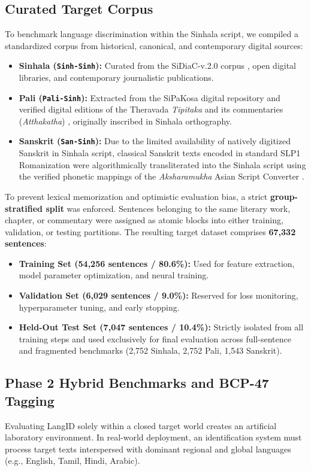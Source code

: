 \documentclass[11pt]{article}
\begin{document}
\subsection{Curated Target Corpus}
To benchmark language discrimination within the Sinhala script, we compiled a standardized corpus from historical, canonical, and contemporary digital sources:
\begin{itemize}
    \item \textbf{Sinhala (\texttt{Sinh-Sinh}):} Curated from the SiDiaC-v.2.0 corpus \cite{welgama2021sidiac}, open digital libraries, and contemporary journalistic publications.
    \item \textbf{Pali (\texttt{Pali-Sinh}):} Extracted from the SiPaKosa digital repository and verified digital editions of the Theravada \textit{Tipitaka} and its commentaries (\textit{Atthakatha}) \cite{norman1983pali}, originally inscribed in Sinhala orthography.
    \item \textbf{Sanskrit (\texttt{San-Sinh}):} Due to the limited availability of natively digitized Sanskrit in Sinhala script, classical Sanskrit texts encoded in standard SLP1 Romanization were algorithmically transliterated into the Sinhala script using the verified phonetic mappings of the \textit{Aksharamukha} Asian Script Converter \cite{rajan2023aksharamukha}.
\end{itemize}

To prevent lexical memorization and optimistic evaluation bias, a strict \textbf{group-stratified split} was enforced. Sentences belonging to the same literary work, chapter, or commentary were assigned as atomic blocks into either training, validation, or testing partitions. The resulting target dataset comprises \textbf{67,332 sentences}:
\begin{itemize}
    \item \textbf{Training Set (54,256 sentences / 80.6\%):} Used for feature extraction, model parameter optimization, and neural training.
    \item \textbf{Validation Set (6,029 sentences / 9.0\%):} Reserved for loss monitoring, hyperparameter tuning, and early stopping.
    \item \textbf{Held-Out Test Set (7,047 sentences / 10.4\%):} Strictly isolated from all training steps and used exclusively for final evaluation across full-sentence and fragmented benchmarks (2,752 Sinhala, 2,752 Pali, 1,543 Sanskrit).
\end{itemize}

\subsection{Phase 2 Hybrid Benchmarks and BCP-47 Tagging}
Evaluating LangID solely within a closed target world creates an artificial laboratory environment. In real-world deployment, an identification system must process target texts interspersed with dominant regional and global languages (e.g., English, Tamil, Hindi, Arabic).
\end{document}
